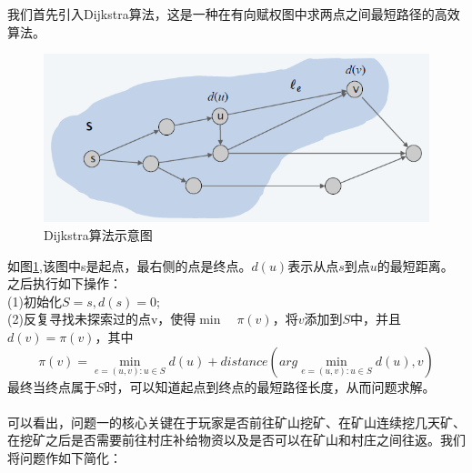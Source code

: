\documentclass[withoutpre]{cumcmthesis} %
\begin{document}
我们首先引入Dijkstra算法，这是一种在有向赋权图中求两点之间最短路径的高效算法。
\begin{figure}[H]
	\centering
	\includegraphics[scale=0.7]{figures/Dijkstra.png}
	\caption{Dijkstra算法示意图}
	\label{fig:Dijkstra}
\end{figure}
如图\ref{fig:Dijkstra},该图中s是起点，最右侧的点是终点。$d(u)$表示从点$s$到点$u$的最短距离。之后执行如下操作：\\
(1)初始化$S={s},d(s)=0$;\\
(2)反复寻找未探索过的点v，使得$\min\quad\pi(v)$，将$v$添加到$S$中，并且$d(v)=\pi(v)$，其中
$$\pi(v)=\min_{e=(u,v):u\in S}d(u)+distance(arg\min_{e=(u,v):u\in S}d(u),v)$$
最终当终点属于$S$时，可以知道起点到终点的最短路径长度，从而问题求解。\\\\
可以看出，问题一的核心关键在于玩家是否前往矿山挖矿、在矿山连续挖几天矿、在挖矿之后是否需要前往村庄补给物资以及是否可以在矿山和村庄之间往返。我们将问题作如下简化：
\end{document}
